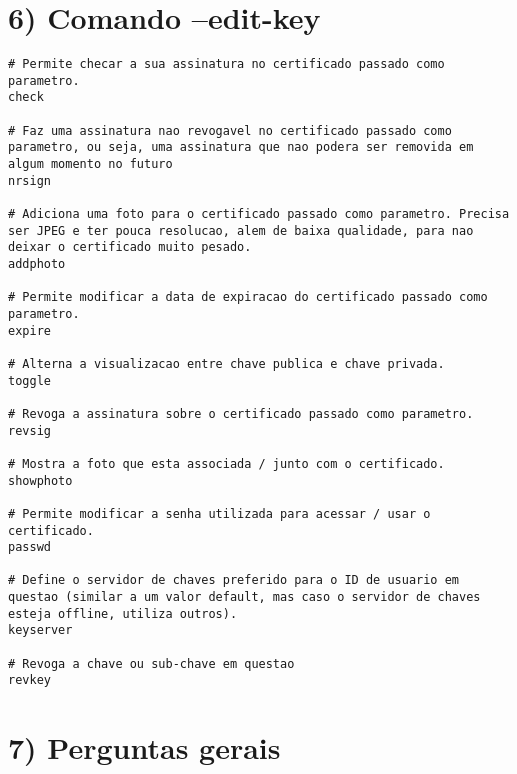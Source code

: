 \documentclass[a4paper,11pt]{article}
\theoremstyle{mytheor}
\begin{document}
\section*{6) Comando --edit-key}
\begin{lstlisting}
# Permite checar a sua assinatura no certificado passado como parametro.
check

# Faz uma assinatura nao revogavel no certificado passado como parametro, ou seja, uma assinatura que nao podera ser removida em algum momento no futuro
nrsign

# Adiciona uma foto para o certificado passado como parametro. Precisa ser JPEG e ter pouca resolucao, alem de baixa qualidade, para nao deixar o certificado muito pesado.
addphoto

# Permite modificar a data de expiracao do certificado passado como parametro.
expire

# Alterna a visualizacao entre chave publica e chave privada.
toggle

# Revoga a assinatura sobre o certificado passado como parametro.
revsig

# Mostra a foto que esta associada / junto com o certificado.
showphoto

# Permite modificar a senha utilizada para acessar / usar o certificado.
passwd

# Define o servidor de chaves preferido para o ID de usuario em questao (similar a um valor default, mas caso o servidor de chaves esteja offline, utiliza outros).
keyserver

# Revoga a chave ou sub-chave em questao
revkey
\end{lstlisting}

\section*{7) Perguntas gerais}
\end{document}
